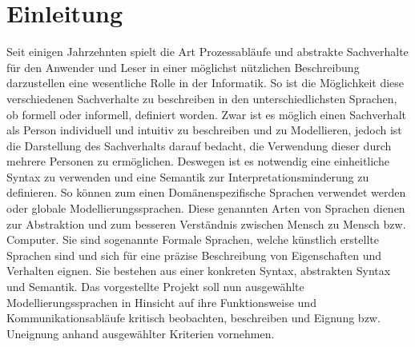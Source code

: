 \chapter{Einleitung}
\label{ch:Einleitung}
Seit einigen Jahrzehnten spielt die Art Prozessabläufe und abstrakte Sachverhalte für den Anwender und Leser in einer möglichst nützlichen Beschreibung darzustellen eine wesentliche Rolle in der Informatik. So ist die Möglichkeit diese verschiedenen Sachverhalte zu beschreiben in den unterschiedlichsten Sprachen, ob formell oder informell, definiert worden. Zwar ist es möglich einen Sachverhalt als Person individuell und intuitiv zu beschreiben und zu Modellieren, jedoch ist die Darstellung des Sachverhalts darauf bedacht, die Verwendung dieser durch mehrere Personen zu ermöglichen. Deswegen ist es notwendig eine einheitliche Syntax zu verwenden und eine Semantik zur Interpretationsminderung zu definieren. So können zum einen Domänenspezifische Sprachen verwendet werden oder globale Modellierungssprachen. Diese genannten Arten von Sprachen dienen zur Abstraktion und zum besseren Verständnis zwischen Mensch zu Mensch bzw. Computer. Sie sind sogenannte Formale Sprachen, welche künstlich erstellte Sprachen sind und sich für eine präzise Beschreibung von Eigenschaften und Verhalten eignen. Sie bestehen aus einer konkreten Syntax, abstrakten Syntax und Semantik. Das vorgestellte Projekt soll nun ausgewählte Modellierungssprachen in Hinsicht auf ihre Funktionsweise und  Kommunikationsabläufe kritisch beobachten, beschreiben und Eignung bzw. Uneignung anhand ausgewählter Kriterien vornehmen. 






